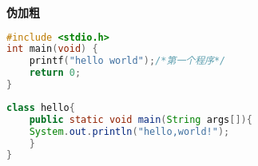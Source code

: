 \begin{appendix}
	\textbf{伪加粗}
\begin{lstlisting}[language=c]
#include <stdio.h>
int main(void) {
    printf("hello world");/*第一个程序*/
    return 0;
}
\end{lstlisting}
\begin{lstlisting}[language=java]
class hello{
	public static void main(String args[]){
	System.out.println("hello,world!");
	}
}
\end{lstlisting}
\end{appendix}